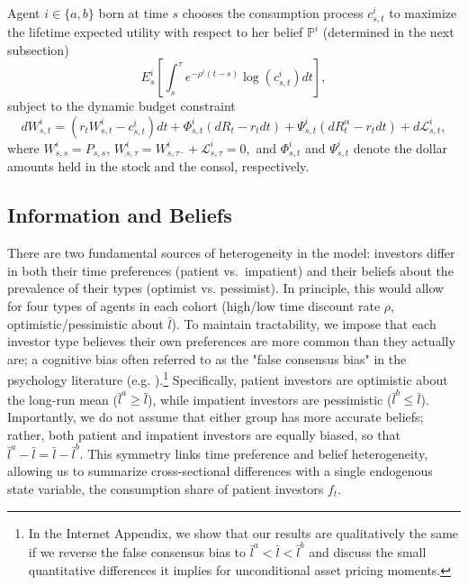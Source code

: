 \documentclass[preprint,11pt,authoryear]{elsarticle}
\theoremstyle{plain}
\begin{document}
Agent $i \in \{a,b\}$ born at time $s$ chooses the consumption process $c^i_{s,t}$ to maximize the lifetime expected utility with respect to her belief $\mathbb{P}^i$ (determined in the next subsection)
\begin{equation} \label{EUdynamic}
	E^i_{s}\left[\int_{s}^{\tau}e^{-\rho^i \left(t-s\right)} \log\left(c^i_{s,t}\right)dt\right],
\end{equation}
subject to the dynamic budget constraint
\begin{equation} \label{wealthdynamics} 
	dW^i_{s,t} = \left(r_tW^i_{s,t} - c^i_{s,t}\right)dt + \Phi^i_{s,t}\left(dR_{t}-r_tdt\right) +\Psi^i_{s,t}\left(dR^{\alpha}_t-r_tdt\right) + d \mathcal{L}_{s,t}^i,
\end{equation}
where $W^i_{s,s} = P_{s,s}$, $W^i_{s,\tau} =W^i_{s,\tau^{-}} + \mathcal{L}_{s,\tau}^i = 0,$ and $\Phi^i_{s,t}$ and $\Psi^i_{s,t}$ denote the dollar amounts held in the stock and the consol, respectively.  

 

\subsection{Information and Beliefs}

There are two fundamental sources of heterogeneity in the model: investors differ in both their time preferences (patient vs.~impatient) and their beliefs about the prevalence of their types (optimist vs. pessimist). In principle, this would allow for four types of agents in each cohort (high/low time discount rate $\rho$, optimistic/pessimistic about $\bar{l}$). 
 To maintain tractability, we impose that each investor type believes their own preferences are more common than they actually are; a cognitive bias often referred to as the "false consensus bias" in the psychology literature (e.g. \cite{RossGreenHouse77}).\footnote{In the Internet Appendix, we show that our results are qualitatively the same if we reverse the false consensus bias to $\bar{l}^a < \bar{l} < \bar{l}^b$ and discuss the small quantitative differences it implies for unconditional asset pricing moments.} Specifically, patient investors are optimistic about the long-run mean ($\bar{l}^a \geq \bar{l}$), while impatient investors are pessimistic ($\bar{l}^b \leq  \bar{l}$). Importantly, we do not assume that either group has more accurate beliefs; rather, both patient and impatient investors are equally biased, so that $\bar{l}^a - \bar{l} = \bar{l} - \bar{l}^b$. This symmetry links time preference and belief heterogeneity, allowing us to summarize cross-sectional differences with a single endogenous state variable, the consumption share of patient investors $f_t$. 
\end{document}
